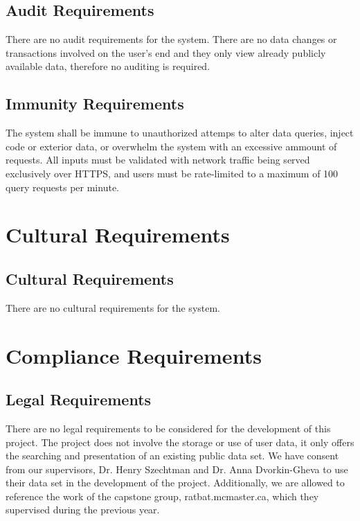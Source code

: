 \documentclass[12pt]{article}
\begin{document}
\subsection{Audit Requirements}

\par{There are no audit requirements for the system. There are no data changes or transactions involved on the user's end 
and they only view already publicly available data, therefore no auditing is required.}

\subsection{Immunity Requirements}

\par{The system shall be immune to unauthorized attemps to alter data queries, inject code or exterior data, or overwhelm 
the system with an excessive ammount of requests. All inputs must be validated with network traffic being served exclusively over HTTPS, 
and users must be rate-limited to a maximum of 100 query requests per minute.}

\section{Cultural Requirements}
\subsection{Cultural Requirements}
\par{There are no cultural requirements for the system.}

\section{Compliance Requirements}
\subsection{Legal Requirements}

\par{There are no legal requirements to be considered for the development of this project. The project does not involve the storage or 
use of user data, it only offers the searching and presentation of an existing public data set. \newline \indent We have consent from our 
supervisors, Dr. Henry Szechtman and Dr. Anna Dvorkin-Gheva to use their data set in the development of the project. Additionally, 
we are allowed to reference the work of the capstone group, ratbat.mcmaster.ca, which they supervised during the previous year.}
\end{document}
